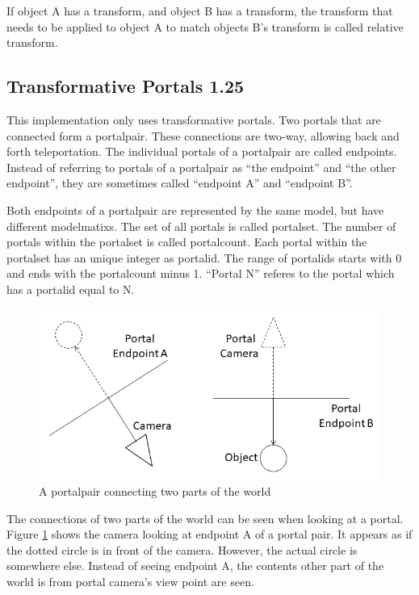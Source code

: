 If object A has a transform, and object B has a transform, the transform that needs to be applied to object A to match objects B's transform is called relative transform.



\subsection{Transformative Portals 1.25}
This implementation only uses transformative portals.  Two portals  that are connected form a \gls{portalpair}. These connections are two-way, allowing back and forth teleportation. The individual portals of a \gls{portalpair} are called \glspl{endpoint}. Instead of referring to portals of a \gls{portalpair} as \enquote{the \gls{endpoint}} and \enquote{the other \gls{endpoint}}, they are sometimes called \enquote{\gls{endpoint} A} and \enquote{\gls{endpoint} B}.

Both \glspl{endpoint} of a \gls{portalpair} are represented by the same model, but have different \glspl{modelmatix}. The set of all portals is called \gls{portalset}. The number of portals within the \gls{portalset} is called \gls{portalcount}. Each portal within the \gls{portalset} has an unique integer as \gls{portalid}. The range of \glspl{portalid} starts with 0 and ends with the \gls{portalcount} minus 1. \enquote{Portal N} referes to the portal which has a \gls{portalid} equal to N.

\begin{figure}[h]
	\includegraphics[width=\linewidth]{images/portal.png}
	\caption{A \gls{portalpair} connecting two parts of the world}
	\label{fig:portal}
\end{figure}

The connections of two parts of the world can be seen when looking at a portal. Figure \ref{fig:portal} shows the camera looking at endpoint A of a portal pair. It appears as if the dotted circle is in front of the camera. However, the actual circle is somewhere else. Instead of seeing endpoint A, the contents other part of the world is from portal camera's view point are seen.

